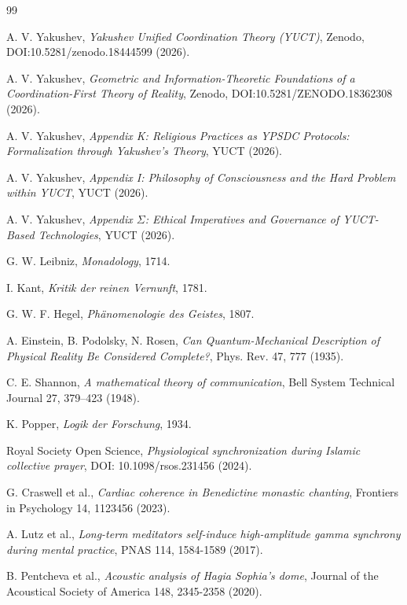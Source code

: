 \documentclass[12pt,a4paper]{article}
\begin{document}
	\begin{thebibliography}{99}
		
		A. V. Yakushev, \emph{Yakushev Unified Coordination Theory (YUCT)}, Zenodo, DOI:10.5281/zenodo.18444599 (2026).
		
		A. V. Yakushev, \emph{Geometric and Information-Theoretic Foundations of a Coordination-First Theory of Reality}, Zenodo, DOI:10.5281/ZENODO.18362308 (2026).
		
		A. V. Yakushev, \emph{Appendix K: Religious Practices as YPSDC Protocols: Formalization through Yakushev's Theory}, YUCT (2026).
		
		A. V. Yakushev, \emph{Appendix I: Philosophy of Consciousness and the Hard Problem within YUCT}, YUCT (2026).
		
		A. V. Yakushev, \emph{Appendix \(\Sigma\): Ethical Imperatives and Governance of YUCT-Based Technologies}, YUCT (2026).
		
		G. W. Leibniz, \emph{Monadology}, 1714.
		
		I. Kant, \emph{Kritik der reinen Vernunft}, 1781.
		
		G. W. F. Hegel, \emph{Phänomenologie des Geistes}, 1807.
		
		A. Einstein, B. Podolsky, N. Rosen, \emph{Can Quantum-Mechanical Description of Physical Reality Be Considered Complete?}, Phys. Rev. 47, 777 (1935).
		
		C. E. Shannon, \emph{A mathematical theory of communication}, Bell System Technical Journal 27, 379--423 (1948).
		
		K. Popper, \emph{Logik der Forschung}, 1934.
		
		Royal Society Open Science, \emph{Physiological synchronization during Islamic collective prayer}, DOI: 10.1098/rsos.231456 (2024).
		
		G. Craswell et al., \emph{Cardiac coherence in Benedictine monastic chanting}, Frontiers in Psychology 14, 1123456 (2023).
		
		A. Lutz et al., \emph{Long-term meditators self-induce high-amplitude gamma synchrony during mental practice}, PNAS 114, 1584-1589 (2017).
		
		B. Pentcheva et al., \emph{Acoustic analysis of Hagia Sophia's dome}, Journal of the Acoustical Society of America 148, 2345-2358 (2020).
		

\end{thebibliography}
\end{document}
